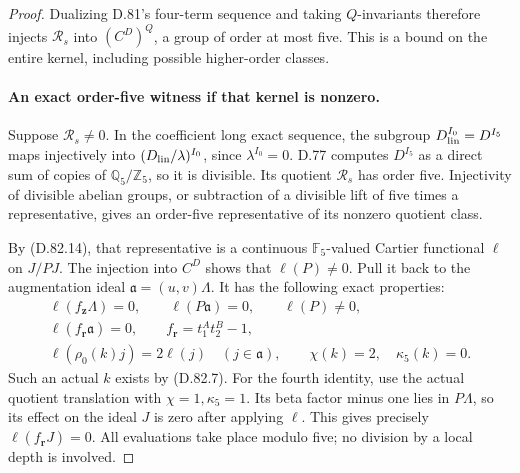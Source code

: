 \begin{proof}
Dualizing D.81's four-term sequence and taking \(Q\)-invariants
therefore injects \(\mathcal R_s\) into
\((C^D)^Q\), a group of order at most five.
This is a bound on the entire kernel, including possible
higher-order classes.

\paragraph{An exact order-five witness if that kernel is nonzero.}
Suppose \(\mathcal R_s\ne0\). In the coefficient long exact
sequence, the subgroup \(D_{\rm lin}^{I_0}=D^{I_5}\) maps
injectively into \((D_{\rm lin}/\lambda)^{I_0}\), since
\(\lambda^{I_0}=0\). D.77 computes \(D^{I_5}\) as a direct
sum of copies of \(\mathbb Q_5/\mathbb Z_5\), so it is
divisible. Its quotient \(\mathcal R_s\) has order five.
Injectivity of divisible abelian groups, or subtraction
of a divisible lift of five times a representative, gives
an order-five representative of its nonzero quotient class.

By (D.82.14), that representative is a continuous
\(\mathbb F_5\)-valued Cartier functional \(\ell\) on \(J/PJ\).
The injection into \(C^D\) shows that \(\ell(P)\ne0\).
Pull it back to the augmentation ideal
\(\mathfrak a=(u,v)\Lambda\). It has the following exact properties:
\[
 \begin{gathered}
 \ell(f_{\mathbf z}\Lambda)=0,\qquad
 \ell(P\mathfrak a)=0,\qquad \ell(P)\ne0,\\
 \ell(f_{\mathbf r}\mathfrak a)=0,\qquad
 f_{\mathbf r}=t_1^A t_2^B-1,\\
 \ell(\rho_0(k)j)=2\ell(j)\quad(j\in\mathfrak a),
       \qquad \chi(k)=2,\quad\kappa_5(k)=0.
 \end{gathered}                                               \tag{D.82.16}
\]
Such an actual \(k\) exists by (D.82.7).
For the fourth identity, use the actual quotient translation
with \(\chi=1,\kappa_5=1\). Its beta factor minus one lies
in \(P\Lambda\), so its effect on the ideal \(J\) is zero
after applying \(\ell\). This gives precisely
\(\ell(f_{\mathbf r}J)=0\).
All evaluations take place modulo five; no division by
a local depth is involved.


\end{proof}
